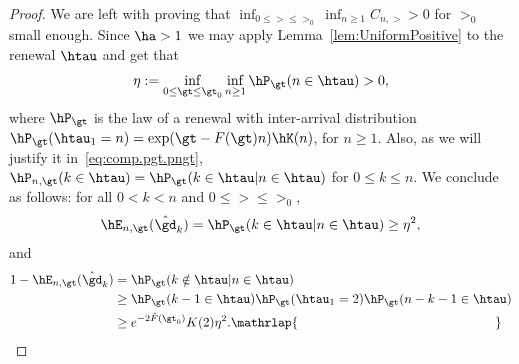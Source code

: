 \begin{proof}
We are left with proving that $\inf_{0\le \gt \le \gt_0} \inf_{n\ge 1} C_{n,\gt} >0$ for $\gt_0$ small enough. Since $\ha> 1$ we may apply Lemma~\ref{lem:UniformPositive} to the renewal $\htau$ and get that
\begin{equation}
\eta := \inf_{0\le \gt \le \gt_0} \inf_{n\ge 1} \hP_\gt(n\in\htau) >0,
\end{equation} where $\hP_{\gt}$ is the law of a renewal with inter-arrival distribution $\hP_\gt(\htau_1 = n) = \exp(\gt - F(\gt) n) \hK(n)$, for $n \geq 1$. Also, as we will justify it in~\eqref{eq:comp.pgt.pngt}, $\hP_{n,\gt}(k\in\htau) = \hP_\gt(k\in\htau | n\in\htau)$ for $0\le k \le n$. We conclude as follows: for all $0<k<n$ and $0\le \gt \le \gt_0$,
\begin{equation}
\hE_{n,\gt}(\hat\gd_k) = \hP_\gt(k\in\htau | n\in\htau) \ge \eta^2,
\end{equation} and
\begin{equation}
\begin{aligned} 1 - \hE_{n,\gt}(\hat\gd_k) &= \hP_\gt(k\notin\htau | n\in\htau) \\
&\ge \hP_\gt(k-1\in\htau)\hP_\gt(\htau_1 = 2)\hP_\gt(n-k-1\in\htau)\\
&\ge e^{-2\hat F(\gt_0)}K(2)\eta^2.\mathrlap{\mkern 275mu\qed}
\end{aligned}
\end{equation}
\let\qed\relax
\smallskip
\end{proof}

